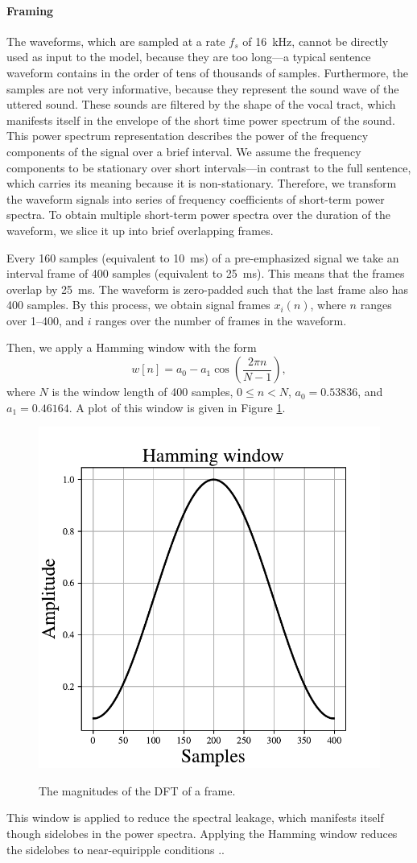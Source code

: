 		\paragraph{Framing}
			The waveforms, which are sampled at a rate $f_s$ of \SI{16}{\kHz}, cannot be directly used as input to the model, because they are too long---a typical sentence waveform contains in the order of tens of thousands of samples.
			Furthermore, the samples are not very informative, because they represent the sound wave of the uttered sound.
			These sounds are filtered by the shape of the vocal tract, which manifests itself in the envelope of the short time power spectrum of the sound.
			This power spectrum representation describes the power of the frequency components of the signal over a brief interval.
			We assume the frequency components to be stationary over short intervals---in contrast to the full sentence, which carries its meaning because it is non-stationary.
			Therefore, we transform the waveform signals into series of frequency coefficients of short-term power spectra.
			To obtain multiple short-term power spectra over the duration of the waveform, we slice it up into brief overlapping frames.


			Every 160 samples (equivalent to \SI{10}{ms}) of a pre-emphasized signal we take an interval frame of 400 samples (equivalent to \SI{25}{ms}).
			This means that the frames overlap by \SI{25}{ms}.
			The waveform is zero-padded such that the last frame also has 400 samples.
			By this process, we obtain signal frames $x_i(n)$, where $n$ ranges over 1--400, and $i$ ranges over the number of frames in the waveform.

			Then, we apply a Hamming window with the form
			\begin{equation}
				w\left[n\right] = a_0 - a_1\cos\left(\frac{2\pi n}{N-1}\right),
			\end{equation}
			where $N$ is the window length of 400 samples, $0 \leq n < N$, $a_0 = 0.53836$, and $a_1 = 0.46164$.
			A plot of this window is given in Figure \ref{fig:hamming}.
			\begin{figure}[ht]
				\centering
			    \includegraphics[width=.45\linewidth]{gfx/hamming}
			    \label{fig:hamming}
			    \caption{The magnitudes of the DFT of a frame.}
			\end{figure}
			This window is applied to reduce the spectral leakage, which manifests itself though sidelobes in the power spectra.
			Applying the Hamming window reduces the sidelobes to near-equiripple conditions \citep{SASPWEB2011}..

